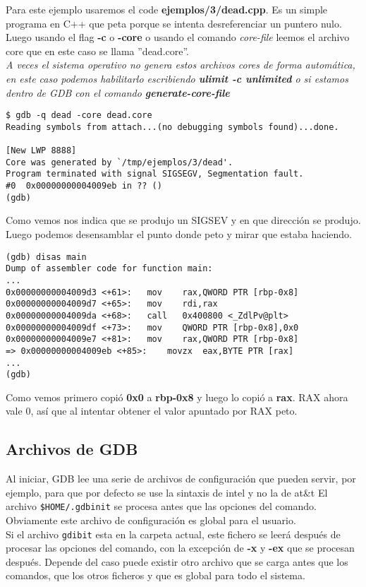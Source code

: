 Para este ejemplo usaremos el code \textbf{ejemplos/3/dead.cpp}. Es un simple programa en C++ que peta porque se intenta desreferenciar un puntero nulo.\\
Luego usando el flag \textbf{-c} o \textbf{-core} o usando el comando \emph{core-file} leemos el archivo core que en este caso se llama ''dead.core''. \\

\emph{A veces el sistema operativo no genera estos archivos cores de forma automática, en este caso podemos habilitarlo escribiendo \textbf{ulimit -c unlimited} o si estamos dentro de GDB con el comando \textbf{generate-core-file}}
\begin{verbatim}
$ gdb -q dead -core dead.core
Reading symbols from attach...(no debugging symbols found)...done.

[New LWP 8888]
Core was generated by `/tmp/ejemplos/3/dead'.
Program terminated with signal SIGSEGV, Segmentation fault.
#0  0x00000000004009eb in ?? ()
(gdb)
\end{verbatim}
Como vemos nos indica que se produjo un SIGSEV y en que dirección se produjo.
Luego podemos desensamblar el punto donde peto y mirar que estaba haciendo.
\begin{verbatim}
(gdb) disas main
Dump of assembler code for function main:
...
0x00000000004009d3 <+61>:	mov    rax,QWORD PTR [rbp-0x8]
0x00000000004009d7 <+65>:	mov    rdi,rax
0x00000000004009da <+68>:	call   0x400800 <_ZdlPv@plt>
0x00000000004009df <+73>:	mov    QWORD PTR [rbp-0x8],0x0
0x00000000004009e7 <+81>:	mov    rax,QWORD PTR [rbp-0x8]
=> 0x00000000004009eb <+85>:	movzx  eax,BYTE PTR [rax]
...
(gdb) 
\end{verbatim}
Como vemos primero copió \textbf{0x0} a \textbf{rbp-0x8} y luego lo copió a \textbf{rax}. RAX ahora vale 0, así que al intentar obtener el valor apuntado por RAX peto.


\subsection{Archivos de GDB}
Al iniciar, GDB lee una serie de archivos de configuración que pueden servir, por ejemplo, para que por defecto se use la sintaxis de intel y no la de at\&t
El archivo \texttt{\$HOME/.gdbinit} se procesa antes que las opciones del comando. Obviamente este archivo de configuración es global para el usuario. \\
Si el archivo \texttt{gdibit} esta en la carpeta actual, este fichero se leerá después de procesar las opciones del comando, con la excepción de \textbf{-x} y \textbf{-ex} que se procesan después. Depende del caso puede existir otro archivo que se carga antes que los comandos, que los otros ficheros y que es global para todo el sistema. \\

